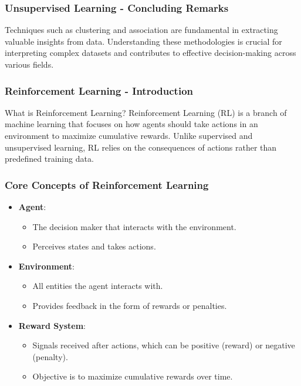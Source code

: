 \documentclass[aspectratio=169]{beamer}
\begin{document}
\begin{frame}[fragile]
    \frametitle{Unsupervised Learning - Concluding Remarks}
    Techniques such as clustering and association are fundamental in extracting valuable insights from data. 
    Understanding these methodologies is crucial for interpreting complex datasets and contributes to effective decision-making across various fields.
\end{frame}

\begin{frame}[fragile]
    \frametitle{Reinforcement Learning - Introduction}
    \begin{block}{What is Reinforcement Learning?}
        Reinforcement Learning (RL) is a branch of machine learning that focuses on how agents should take actions in an environment to maximize cumulative rewards. Unlike supervised and unsupervised learning, RL relies on the consequences of actions rather than predefined training data.
    \end{block}
\end{frame}

\begin{frame}[fragile]
    \frametitle{Core Concepts of Reinforcement Learning}
    \begin{itemize}
        \item \textbf{Agent}:
        \begin{itemize}
            \item The decision maker that interacts with the environment.
            \item Perceives states and takes actions.
        \end{itemize}
        
        \item \textbf{Environment}:
        \begin{itemize}
            \item All entities the agent interacts with.
            \item Provides feedback in the form of rewards or penalties.
        \end{itemize}
        
        \item \textbf{Reward System}:
        \begin{itemize}
            \item Signals received after actions, which can be positive (reward) or negative (penalty).
            \item Objective is to maximize cumulative rewards over time.
        \end{itemize}
    \end{itemize}
\end{frame}
\end{document}
